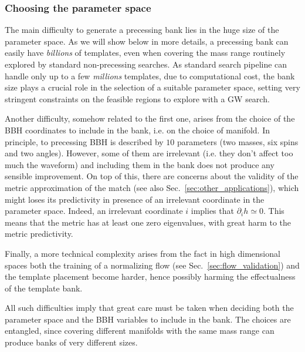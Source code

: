 \documentclass[twocolumn,showpacs,preprintnumbers,nofootinbib,prd,
superscriptaddress,10pt]{revtex4-2}
\begin{document}
\subsubsection{Choosing the parameter space}

The main difficulty to generate a precessing bank lies in the huge size of the parameter space. As we will show below in more details, a precessing bank can easily have {\it billions} of templates, even when covering the mass range routinely explored by standard non-precessing searches. As standard search pipeline can handle only up to a few {\it millions} templates, due to computational cost, the bank size plays a crucial role in the selection of a suitable parameter space, setting very stringent constraints on the feasible regions to explore with a GW search.

Another difficulty, somehow related to the first one, arises from the choice of the BBH coordinates to include in the bank, i.e. on the choice of manifold.
In principle, to precessing BBH is described by $10$ parameters (two masses, six spins and two angles). However, some of them are irrelevant (i.e. they don't affect too much the waveform) and including them in the bank does not produce any sensible improvement.
On top of this, there are concerns about the validity of the metric approximation of the match (see also Sec.~\ref{sec:other_applications}), which might loses its predictivity in presence of an irrelevant coordinate in the parameter space. Indeed, an irrelevant coordinate $i$ implies that $\partial_i h \simeq 0$. This means that the metric has at least one zero eigenvalues, with great harm to the metric predictivity.

Finally, a more technical complexity arises from the fact in high dimensional spaces both the training of a normalizing flow (see Sec.~\ref{sec:flow_validation}) and the template placement become harder, hence possibly harming the effectualness of the template bank.

All such difficulties imply that great care must be taken when deciding both the parameter space and the BBH variables to include in the bank.
The choices are entangled, since covering different manifolds with the same mass range can produce banks of very different sizes.
\end{document}
